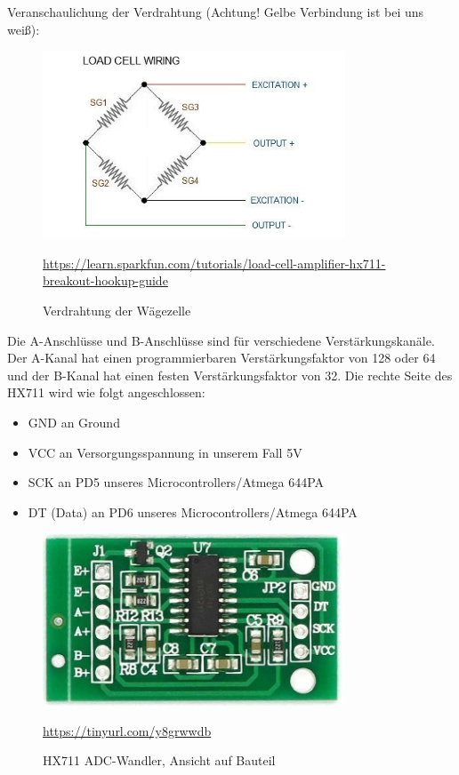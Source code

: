 \newpage

Veranschaulichung der Verdrahtung (Achtung! Gelbe Verbindung ist bei uns weiß):\\
\begin{figure}[ht]
    \center
    \includegraphics[width=9cm]{Bilder/waegezelle-verdrahtung.jpg}\\
    \caption{Verdrahtung der Wägezelle }
    \begin{flushleft} \quelle\url{https://learn.sparkfun.com/tutorials/load-cell-amplifier-hx711-breakout-hookup-guide} \end{flushleft}
\end{figure}
Die A-Anschlüsse und B-Anschlüsse sind für verschiedene Verstärkungskanäle. Der A-Kanal hat einen programmierbaren Verstärkungsfaktor von 128 oder 64 und der B-Kanal hat einen festen Verstärkungsfaktor von 32.
\newpage
Die rechte Seite des HX711 wird wie folgt angeschlossen: 
\begin{itemize}
    \item GND an Ground 
    \item VCC an Versorgungsspannung in unserem Fall 5V 
    \item SCK an PD5 unseres Microcontrollers/Atmega 644PA 
    \item DT (Data) an PD6 unseres Microcontrollers/Atmega 644PA 
\end{itemize}
\begin{figure}[ht]
    \center
    \includegraphics[width=9cm]{Bilder/waegezelle-adc.jpg}\\
    \caption{HX711 ADC-Wandler, Ansicht auf Bauteil}
    \quelle\url{https://tinyurl.com/y8grwwdb}
\end{figure}
